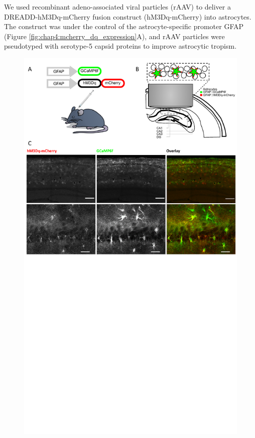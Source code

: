 We used recombinant adeno-associated viral particles (rAAV) to deliver a DREADD-hM3Dq-mCherry fusion construct (hM3Dq-mCherry) into astrocytes.
The construct was under the control of the astrocyte-specific promoter GFAP (Figure \ref{fig:chap4:mcherry_dq_expression}A), and rAAV particles were pseudotyped with serotype-5 capsid proteins to improve astrocytic tropism.
\begin{figure}[h!]
    \centering
    \includegraphics[trim={0 320 0 0},clip,width=\textwidth]{Figures/Chapter4/mcherry_gcamp_expression.pdf}

\end{figure}
